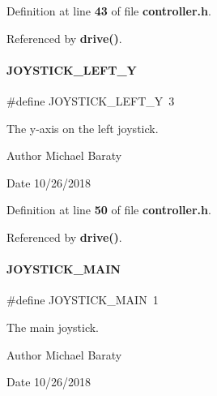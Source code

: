 Definition at line \textbf{ 43} of file \textbf{ controller.\+h}.



Referenced by \textbf{ drive()}.

\mbox{\label{controller_8h_a6bcde37449b440f8d1d05a4a66761935}} 
\paragraph{J\+O\+Y\+S\+T\+I\+C\+K\+\_\+\+L\+E\+F\+T\+\_\+Y}
{\footnotesize\ttfamily \#define J\+O\+Y\+S\+T\+I\+C\+K\+\_\+\+L\+E\+F\+T\+\_\+Y~3}



The y-\/axis on the left joystick. 

\begin{DoxyAuthor}{Author}
Michael Baraty 
\end{DoxyAuthor}
\begin{DoxyDate}{Date}
10/26/2018 
\end{DoxyDate}


Definition at line \textbf{ 50} of file \textbf{ controller.\+h}.



Referenced by \textbf{ drive()}.

\mbox{\label{controller_8h_ac82ac8ca80ad9c01cbb6bd5b950b6d09}} 
\paragraph{J\+O\+Y\+S\+T\+I\+C\+K\+\_\+\+M\+A\+IN}
{\footnotesize\ttfamily \#define J\+O\+Y\+S\+T\+I\+C\+K\+\_\+\+M\+A\+IN~1}



The main joystick. 

\begin{DoxyAuthor}{Author}
Michael Baraty 
\end{DoxyAuthor}
\begin{DoxyDate}{Date}
10/26/2018 
\end{DoxyDate}


